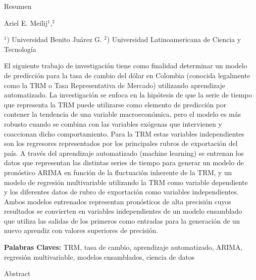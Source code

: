 
\Large
 \begin{center}
Resumen\\
\hspace{5pt}

\large
Ariel E. Meilij$^1,^2$  \\
\hspace{5pt}

\small
$^1$) Universidad Benito Juárez G.
$^2$) Universidad Latinoamericana de Ciencia y Tecnología
\end{center}
\hspace{5pt}

\normalsize
El siguiente trabajo de investigación tiene como finalidad determinar un modelo de predicción para la tasa de cambio del dólar en Colombia (conocida legalmente como la TRM o Tasa Representativa de Mercado) utilizando aprendizaje automatizado. La investigación se enfoca en la hipótesis de que la serie de tiempo que representa la TRM puede utilizarse como elemento de predicción por contener la tendencia de una variable macroeconómica, pero el modelo es más robusto cuando se combina con las variables exógenas que intervienen y coaccionan dicho comportamiento. Para la TRM estas variables independientes son los regresores representados por los principales rubros de exportación del país. A través del aprendizaje automatizado (machine learning) se entrenan los datos que representan las distintas series de tiempo para generar un modelo de pronóstico ARIMA en función de la fluctuación inherente de la TRM, y un modelo de regresión multivariable utilizando la TRM como variable dependiente y los diferentes datos de rubro de exportación como variables independientes. Ambos modelos entrenados representan pronósticos de alta precisión cuyos resultados se convierten en variables independientes de un modelo ensamblado que utiliza las salidas de los primeros como entradas para la generación de un nuevo aprendiz con valores superiores de precisión.

\textbf{Palabras Claves:} TRM, tasa de cambio, aprendizaje automatizado, ARIMA, regresión multivariable, modelos ensamblados, ciencia de datos


\hspace{10pt}

\Large
 \begin{center}
Abstract\\
\hspace{5pt}
\end{center}

